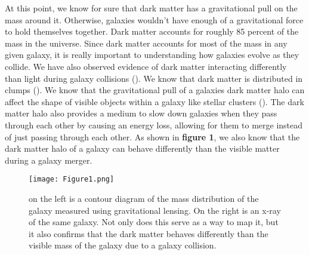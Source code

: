 \documentclass[fleqn,usenatbib]{mnras}
\begin{document}
        At this point, we know for sure that dark matter has a gravitational pull on the mass around it. Otherwise, galaxies wouldn't have enough of a gravitational force to hold themselves together. Dark matter accounts for roughly 85 percent of the mass in the universe. Since dark matter accounts for most of the mass in any given galaxy, it is really important to understanding how galaxies evolve as they collide. We have also observed evidence of dark matter interacting differently than light during galaxy collisions (\citet{Clowe2006}). We know that dark matter is distributed in clumps (\citet{Banik2018}). We know that the gravitational pull of a galaxies dark matter halo can affect the shape of visible objects within a galaxy like stellar clusters (\citet{Erkal2017}). The dark matter halo also provides a medium to slow down galaxies when they pass through each other by causing an energy loss, allowing for them to merge instead of just passing through each other. As shown in \textbf{figure 1}, we also know that the dark matter halo of a galaxy can behave differently than the visible matter during a galaxy merger.
        
\begin{figure}
                \centering
                \texttt{[image: Figure1.png]}
                \label{fig:enter-label}
            \caption{on the left is a contour diagram of the mass distribution of the galaxy measured using gravitational lensing. On the right is an x-ray of the same galaxy. Not only does this serve as a way to map it, but it also confirms that the dark matter behaves differently than the visible mass of the galaxy due to a galaxy collision.}
            \end{figure}
                        
\end{document}
